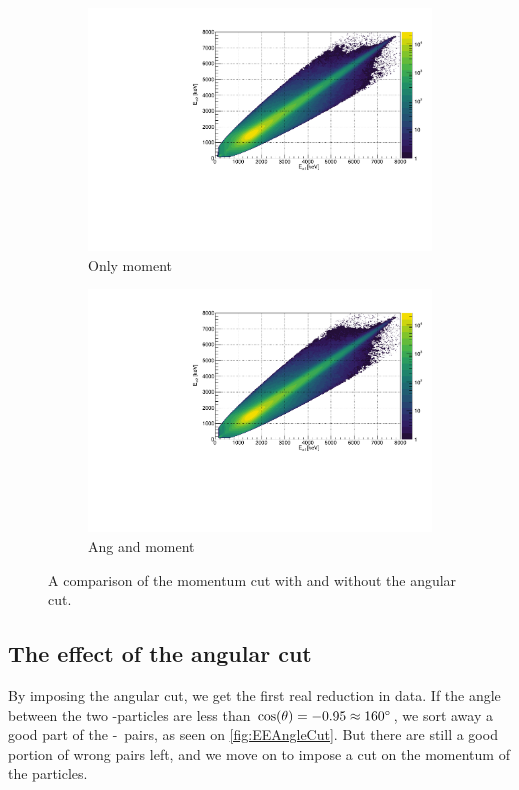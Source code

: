 \begin{figure}[H]
	\begin{subfigure}[t]{0.5\linewidth}
		\includegraphics[width=\linewidth]{../figures/EEMomentumCut.pdf}
		\caption{Only moment}
	\end{subfigure}
	\begin{subfigure}[t]{0.5\linewidth}
		\includegraphics[width=\linewidth]{../figures/EEAngAndMoment.pdf}
		\caption{Ang and moment}
	\end{subfigure}
\caption{A comparison of the momentum cut with and without the angular cut.}
\label{fig:AngAndMomentCompare}
\end{figure}

\subsection{The effect of the angular cut}
By imposing the angular cut, we get the first real reduction in data. If the angle between the two \al-particles are less than $\cos(\theta) = -0.95 \approx 160\degree$, we sort away a good part of the \be-\al\ pairs, as seen on \cref{fig:EEAngleCut}. But there are still a good portion of wrong pairs left, and we move on to impose a cut on the momentum of the particles. 



